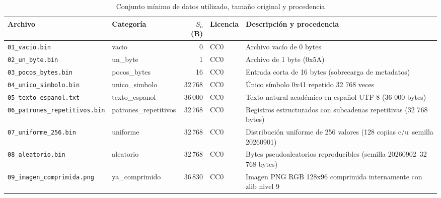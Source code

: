 \begin{table}[H]\centering\footnotesize
\caption{Conjunto mínimo de datos utilizado, tamaño original y procedencia}\label{tab:corpus}
\begin{tabularx}{\textwidth}{@{}llrl>{\raggedright\arraybackslash}X@{}}\toprule
Archivo & Categoría & $S_o$ (B) & Licencia & Descripción y procedencia \\ \midrule
\texttt{01\_vacio.bin} & vacio & 0 & CC0 & Archivo vacío de 0 bytes \\
\texttt{02\_un\_byte.bin} & un\_byte & 1 & CC0 & Archivo de 1 byte (0x5A) \\
\texttt{03\_pocos\_bytes.bin} & pocos\_bytes & 16 & CC0 & Entrada corta de 16 bytes (sobrecarga de metadatos) \\
\texttt{04\_unico\_simbolo.bin} & unico\_simbolo & 32\,768 & CC0 & Único símbolo 0x41 repetido 32 768 veces \\
\texttt{05\_texto\_espanol.txt} & texto\_espanol & 36\,000 & CC0 & Texto natural académico en español UTF-8 (36 000 bytes) \\
\texttt{06\_patrones\_repetitivos.bin} & patrones\_repetitivos & 32\,768 & CC0 & Registros estructurados con subcadenas repetitivas (32 768 bytes) \\
\texttt{07\_uniforme\_256.bin} & uniforme & 32\,768 & CC0 & Distribución uniforme de 256 valores (128 copias c/u\, semilla 20260901) \\
\texttt{08\_aleatorio.bin} & aleatorio & 32\,768 & CC0 & Bytes pseudoaleatorios reproducibles (semilla 20260902\, 32 768 bytes) \\
\texttt{09\_imagen\_comprimida.png} & ya\_comprimido & 36\,830 & CC0 & Imagen PNG RGB 128x96 comprimida internamente con zlib nivel 9 \\
\bottomrule\end{tabularx}\end{table}

